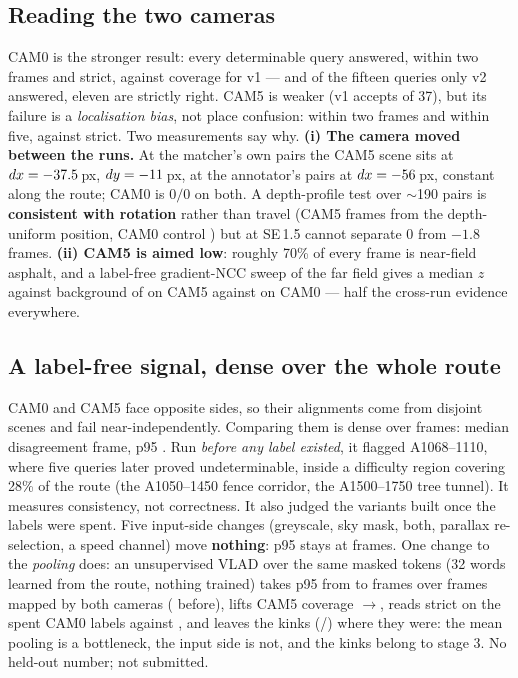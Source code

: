 \documentclass[10pt,a4paper]{article}
\begin{document}
\subsection{Reading the two cameras}

CAM0 is the stronger result: every determinable query answered,
\TolVtwoCamZeroTwo{} within two frames and \SubCamZeroPrecision{} strict, against
\SparseCamZeroCoverage{} coverage for v1 --- and of the fifteen queries only v2
answered, eleven are strictly right. CAM5 is weaker (v1 accepts
\SparseCamFiveAccepted{} of 37), but its failure is a \emph{localisation bias},
not place confusion: \TolVtwoCamFiveTwo{} within two frames and
\TolVtwoCamFiveFive{} within five, against \SubCamFivePrecision{} strict. Two
measurements say why. \textbf{(i) The camera moved between the runs.} At the
matcher's own pairs the CAM5 scene sits at $dx = -37.5$\,px,
$dy = -11$\,px, at the annotator's pairs at
$dx = -56$\,px, constant along the route; CAM0 is $0/0$ on both.
A depth-profile test over $\sim$190 pairs is \textbf{consistent with rotation}
rather than travel (CAM5 \ParallaxCamFiveOffset{} frames from the depth-uniform
position, CAM0 control \ParallaxCamZeroOffset{}) but at SE\,1.5 cannot separate
$0$ from $-1.8$ frames. \textbf{(ii) CAM5 is aimed low}: roughly 70\% of every
frame is near-field asphalt, and a label-free gradient-NCC sweep of the far
field gives a median $z$ against background of \EvidenceZCamFive{} on CAM5
against \EvidenceZCamZero{} on CAM0 --- half the cross-run evidence everywhere.

\subsection{A label-free signal, dense over the whole route}

CAM0 and CAM5 face opposite sides, so their alignments come from disjoint scenes
and fail near-independently. Comparing them is dense over \ConsistencyFrames{}
frames: median disagreement \ConsistencyMedian{} frame, p95
\ConsistencyPninetyfive{}. Run \emph{before any label existed}, it flagged
A1068--1110, where five queries later proved undeterminable, inside a difficulty
region covering 28\% of the route (the A1050--1450 fence corridor, the
A1500--1750 tree tunnel). It measures consistency, not correctness. It also
judged the variants built once the labels were spent. Five input-side changes
(greyscale, sky mask, both, parallax re-selection, a speed channel) move
\textbf{nothing}: p95 stays at \VariantPninetyfiveRange{} frames. One change to
the \emph{pooling} does: an unsupervised VLAD over the same masked tokens (32
words learned from the route, nothing trained) takes p95 from
\ConsistencyPninetyfive{} to \VladPninetyfive{} frames over \VladFrames{} frames
mapped by both cameras (\BaselineFrames{} before), lifts CAM5 coverage
\BaselineCoverageCamFive{}$\to$\VladCoverageCamFive{}, reads \VladSpentCamZero{}
strict on the spent CAM0 labels against \SubCamZeroPrecision{}, and leaves the
kinks (\VladKinkCamZero{}/\VladKinkCamFive{}) where they were: the mean pooling
is a bottleneck, the input side is not, and the kinks belong to stage 3. No
held-out number; not submitted.
\end{document}
